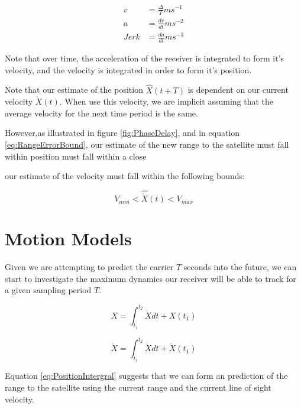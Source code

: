 \begin{comment}
Need to fix this up
\end{comment}

\begin{align}
v & = \frac{\Delta}{T} m s^{-1} \\
a & = \frac{dv}{dt} m s^{-2} \\
Jerk & = \frac{da}{dt} m s^{-3}
\end{align}


Note that over time, the acceleration of the receiver is integrated to form it's velocity, and the velocity is integrated in order to form it's position. 

Note that our estimate of the position $\hat{X}(t+T)$ is dependent on our current velocity $\dot{X}(t)$. When use this velocity, we are implicit assuming that the average velocity for the next time period is the same. 

However,as illustrated in figure \ref{fig:PhaseDelay}, and in equation \ref{eq:RangeErrorBound}, our estimate of the new range to the satellite must fall within 
position must fall within a close 

our estimate of the velocity must fall within the following bounds:



\begin{equation}
V_{min} < \hat{\dot{X}}(t) < V_{max}
\end{equation}





\section{Motion Models}

Given we are attempting to predict the carrier $T$ seconds into the future, we can start to investigate the maximum dynamics our receiver will be able to track for a given sampling period $T$. \cite{salas1999etgen}


\begin{equation}
X = \int_{t_1}^{t_2} \dot{X} dt + X(t_1)
\label{eq:PositionIntergral}
\end{equation}

\begin{equation}
\dot{X} = \int_{t_1}^{t_2} \ddot{X} dt + \dot{X}(t_1)
\end{equation}


Equation \ref{eq:PositionIntergral} suggests that we can form an prediction of the range to the satellite using the current range and the current line of sight velocity. 

